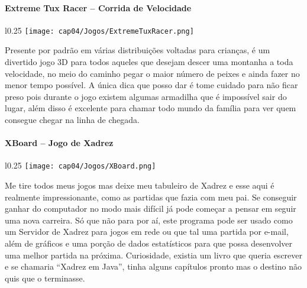 \paragraph{Extreme Tux Racer – Corrida de Velocidade}
\begin{minipage}{\linewidth}
 \vspace{5pt}
 \begin{wrapfigure}{l}{0.25\textwidth}
  \vspace{-\baselineskip}
  \texttt{[image: cap04/Jogos/ExtremeTuxRacer.png]} 
 \end{wrapfigure}
 Presente por padrão em várias distribuições voltadas para crianças, é um divertido jogo 3D para todos aqueles que desejam descer uma montanha a toda velocidade, no meio do caminho pegar o maior número de peixes e ainda fazer no menor tempo possível. A única dica que posso dar é tome cuidado para não ficar preso pois durante o jogo existem algumas armadilha que é impossível sair do lugar, além disso é excelente para chamar todo mundo da família para ver quem consegue chegar na linha de chegada.
\end{minipage}

\paragraph{XBoard – Jogo de Xadrez}
\begin{minipage}{\linewidth}
 \vspace{5pt}
 \begin{wrapfigure}{l}{0.25\textwidth}
  \vspace{-\baselineskip}
  \texttt{[image: cap04/Jogos/XBoard.png]} 
 \end{wrapfigure}
 Me tire todos meus jogos mas deixe meu tabuleiro de Xadrez e esse aqui é realmente impressionante, como as partidas que fazia com meu pai. Se conseguir ganhar do computador no modo mais difícil já pode começar a pensar em seguir uma nova carreira. Só que não para por aí, este programa pode ser usado como um Servidor de Xadrez para jogos em rede ou que tal uma partida por e-mail, além de gráficos e uma porção de dados estatísticos para que possa desenvolver uma melhor partida na próxima. Curiosidade, existia um livro que queria escrever e se chamaria ``Xadrez em Java'', tinha alguns capítulos pronto mas o destino não quis que o terminasse.
\end{minipage}

